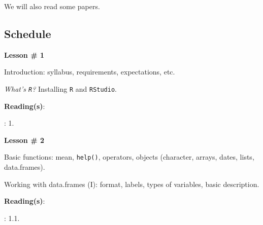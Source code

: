 \documentclass[letterpaper]{article}
\renewenvironment{itemize}{
  \begin{list}{}{
    \setlength{\leftmargin}{1.5em}
  }
}{
  \end{list}
}
\begin{document}
\begin{itemize}
\item[{\color{red}\Pointinghand}] We will also read some papers.
\end{itemize}


\subsection*{Schedule}


\begin{enumerate}
	\item {}

			\begin{itemize} 
				\item[$\bullet$] {\bf Lesson \# 1} %
				\begin{itemize} 
					\item[$\circ$] Introduction: syllabus, requirements, expectations, etc.
					\item[$\circ$] \emph{What's \texttt{R}?} Installing \texttt{R} and \texttt{RStudio}.
					\item[$\circ$] {\bf Reading(s)}: 
						\begin{itemize} 
							\item[$\diamond$] \textcite{Wooldridge2002}: 1.
									\end{itemize}
				\end{itemize}
			\end{itemize}






			\begin{itemize} 
				\item[$\bullet$] {\bf Lesson \# 2} %
				\begin{itemize} 
					\item[$\circ$] Basic functions: mean, \texttt{help()}, operators, objects (character, arrays, dates, lists, data.frames).
					\item[$\circ$] Working with data.frames (I): format, labels, types of variables, basic description. %
					\item[$\circ$] {\bf Reading(s)}: 
					\begin{itemize}
						\item[$\diamond$] \textcite{Fox:2010vc}: 1.1.
					\end{itemize}
				\end{itemize}
			\end{itemize}





\end{enumerate}
\end{document}
